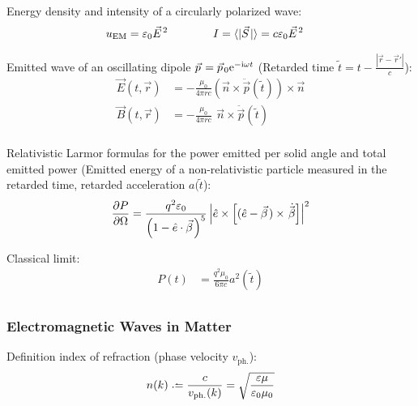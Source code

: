 			\noindent
			Energy density and intensity of a circularly polarized wave:
			\begin{equation}
				\begin{aligned}
					u_{\text{EM}} &= \varepsilon_0\vec{E}^2 &\hsp
					I &= \langle|\vec{S}|\rangle = c\varepsilon_0\vec{E}^2
				\end{aligned}
			\end{equation}

			\noindent
			Emitted wave of an oscillating dipole $\vec{p} = \vec{p}_0 \ex^{-\i\omega t}$ (Retarded time $\tilde{t} = t-\frac{\left|\vec{r}-\vec{r}'\right|}{c}$):
			\begin{equation}
				\begin{aligned}
					\vec{E}(t,\vec{r}) &= -\frac{\mu_0}{4\pi r c}	\left(\vec{n}\times\ddot{\vec{p}}(\tilde{t})\right) \times \vec{n} \\
					\vec{B}(t,\vec{r}) &= -\frac{\mu_0}{4\pi r c} \phantom{\Big(}\vec{n}\times\ddot{\vec{p}}(\tilde{t}) \\
				\end{aligned}
			\end{equation}

			\noindent
			Relativistic Larmor formulas for the power emitted per solid angle and total emitted power (Emitted energy of a non-relativistic particle measured in the retarded time, retarded acceleration $a(\tilde{t}$):
			\begin{equation}
				\begin{aligned}
					\pdv{P}{\Omega} &= \frac{q^2 \varepsilon_0}{\qty(1-\hat{e}\cdot\vec{\beta})^5} \left| \hat{e}\times\qty[(\hat{e}-\vec{\beta}) \times \dot{\vec{\beta}}] \right|^2 \\
				\end{aligned}
			\end{equation}

			\noindent
			Classical limit:
			\begin{equation}
				\begin{aligned}
					P(t) &= \frac{q^2 \mu_0}{6\pi c}a^2(\tilde{t}) \\
				\end{aligned}
			\end{equation}


		\subsubsection{Electromagnetic Waves in Matter}
			\noindent
			Definition index of refraction (phase velocity $v_\text{ph.}$):
			\begin{equation}
				n(k) \defeq \frac{c}{v_\text{ph.}(k)} = \sqrt{\frac{\varepsilon\mu}{\varepsilon_0\mu_0}}
			\end{equation}

